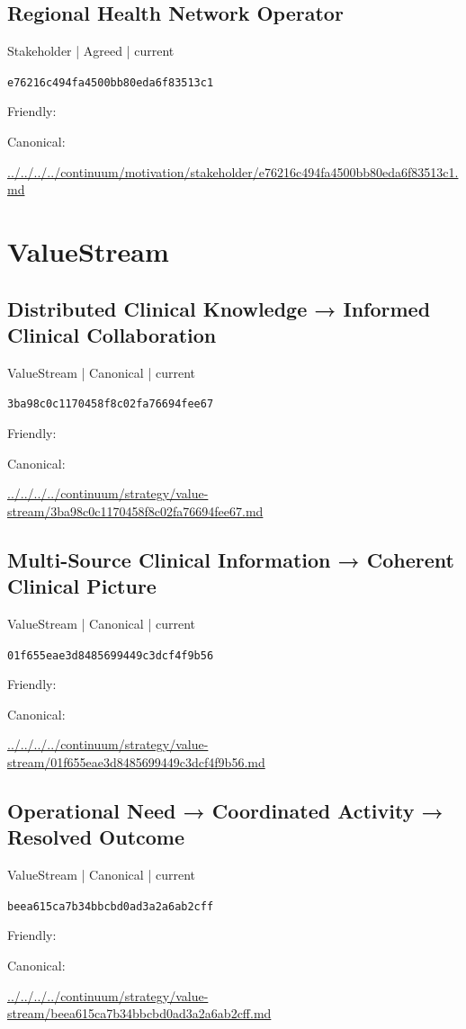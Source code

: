 \documentclass[10pt,a4paper]{article}
\begin{document}
\subsection*{Regional Health Network Operator}
{\small Stakeholder | Agreed | current}\par
\texttt{e76216c494fa4500bb80eda6f83513c1}\par
Friendly: \par
Canonical: \par
{\footnotesize\url{../../../../continuum/motivation/stakeholder/e76216c494fa4500bb80eda6f83513c1.md}}\par
\section*{ValueStream}
\subsection*{Distributed Clinical Knowledge → Informed Clinical Collaboration}
{\small ValueStream | Canonical | current}\par
\texttt{3ba98c0c1170458f8c02fa76694fee67}\par
Friendly: \par
Canonical: \par
{\footnotesize\url{../../../../continuum/strategy/value-stream/3ba98c0c1170458f8c02fa76694fee67.md}}\par
\subsection*{Multi-Source Clinical Information → Coherent Clinical Picture}
{\small ValueStream | Canonical | current}\par
\texttt{01f655eae3d8485699449c3dcf4f9b56}\par
Friendly: \par
Canonical: \par
{\footnotesize\url{../../../../continuum/strategy/value-stream/01f655eae3d8485699449c3dcf4f9b56.md}}\par
\subsection*{Operational Need → Coordinated Activity → Resolved Outcome}
{\small ValueStream | Canonical | current}\par
\texttt{beea615ca7b34bbcbd0ad3a2a6ab2cff}\par
Friendly: \par
Canonical: \par
{\footnotesize\url{../../../../continuum/strategy/value-stream/beea615ca7b34bbcbd0ad3a2a6ab2cff.md}}\par
\end{document}
